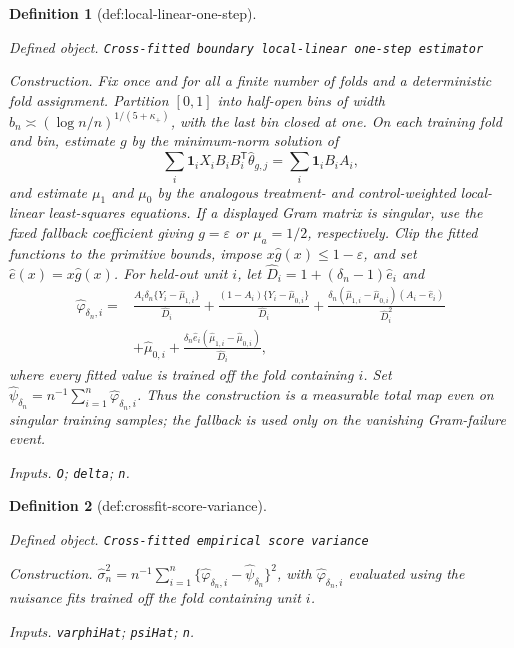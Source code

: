 \documentclass{article}
\newtheorem{definition}{Definition}
\begin{document}
\begin{definition}[def:local-linear-one-step]\label{def:local-linear-one-step}
\par\smallskip\noindent\emph{Defined object.} \texttt{Cross-\allowbreak{}fitted boundary local-\allowbreak{}linear one-\allowbreak{}step estimator}
\par\smallskip\noindent\emph{Construction.} Fix once and for all a finite number of folds and a deterministic fold assignment.  Partition \([0,1]\) into half-open bins of width \(b_n\asymp(\log n/n)^{1/(5+\kappa_+)}\), with the last bin closed at one.  On each training fold and bin, estimate \(g\) by the minimum-norm solution of
\[
 \sum_i\mathbf 1_i X_iB_iB_i^{\mathsf T}\widehat\theta_{g,j}
 =\sum_i\mathbf 1_iB_iA_i,
\]
and estimate \(\mu_1\) and \(\mu_0\) by the analogous treatment- and control-weighted local-linear least-squares equations.  If a displayed Gram matrix is singular, use the fixed fallback coefficient giving \(g=\varepsilon\) or \(\mu_a=1/2\), respectively.  Clip the fitted functions to the primitive bounds, impose \(x\widehat g(x)\leq1-\varepsilon\), and set \(\widehat e(x)=x\widehat g(x)\).  For held-out unit \(i\), let \(\widehat D_i=1+(\delta_n-1)\widehat e_i\) and
\[
\begin{split}
 \widehat\varphi_{\delta_n,i}={}&
 \frac{A_i\delta_n\{Y_i-\widehat\mu_{1,i}\}}{\widehat D_i}
 +\frac{(1-A_i)\{Y_i-\widehat\mu_{0,i}\}}{\widehat D_i}
 +\frac{\delta_n(\widehat\mu_{1,i}-\widehat\mu_{0,i})(A_i-\widehat e_i)}{\widehat D_i^2}\\
 &+\widehat\mu_{0,i}
 +\frac{\delta_n\widehat e_i(\widehat\mu_{1,i}-\widehat\mu_{0,i})}{\widehat D_i},
\end{split}
\]
where every fitted value is trained off the fold containing \(i\).  Set \(\widehat\psi_{\delta_n}=n^{-1}\sum_{i=1}^n\widehat\varphi_{\delta_n,i}\).  Thus the construction is a measurable total map even on singular training samples; the fallback is used only on the vanishing Gram-failure event.
\par\smallskip\noindent\emph{Inputs.} \texttt{O}; \texttt{delta}; \texttt{n}.
\end{definition}

\begin{definition}[def:crossfit-score-variance]\label{def:crossfit-score-variance}
\par\smallskip\noindent\emph{Defined object.} \texttt{Cross-\allowbreak{}fitted empirical score variance}
\par\smallskip\noindent\emph{Construction.} \(\widehat\sigma_n^2=n^{-1}\sum_{i=1}^n\{\widehat\varphi_{\delta_n,i}-\widehat\psi_{\delta_n}\}^2\), with \(\widehat\varphi_{\delta_n,i}\) evaluated using the nuisance fits trained off the fold containing unit \(i\).
\par\smallskip\noindent\emph{Inputs.} \texttt{varphiHat}; \texttt{psiHat}; \texttt{n}.
\end{definition}
\end{document}

